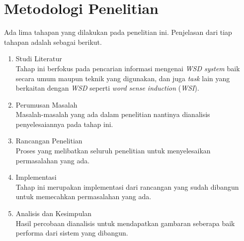 \section{Metodologi Penelitian}
Ada lima tahapan yang dilakukan pada penelitian ini. Penjelasan dari tiap tahapan adalah sebagai berikut.
\begin{enumerate}
	\item Studi Literatur \\
	Tahap ini berfokus pada pencarian informasi mengenai \textit{WSD system} baik secara umum maupun teknik yang digunakan, dan juga \textit{task} lain yang berkaitan dengan \textit{WSD} seperti \textit{word sense induction} (\textit{WSI}).
	\item Perumusan Masalah \\
	Masalah-masalah yang ada dalam penelitian nantinya dianalisis penyelesaiannya pada tahap ini.
	\item Rancangan Penelitian\\
	Proses yang melibatkan seluruh penelitian untuk menyelesaikan permasalahan yang ada.
	\item Implementasi\\
	Tahap ini merupakan implementasi dari rancangan yang sudah dibangun untuk memecahkan permasalahan yang ada.
	\item Analisis dan Kesimpulan \\
	Hasil percobaan dianalisis untuk mendapatkan gambaran seberapa baik performa dari sistem yang dibangun.
\end{enumerate}


